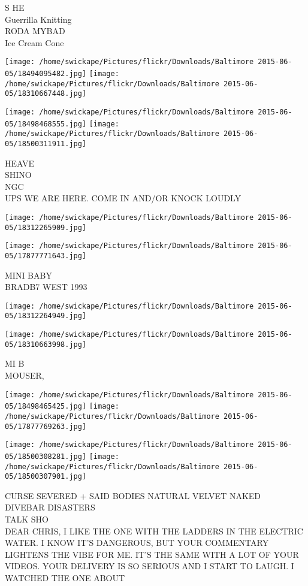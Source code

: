 \documentclass[10pt,letterpaper]{article}
\begin{document}
S HE\\
Guerrilla Knitting\\
RODA MYBAD\\
Ice Cream Cone
\pagebreak

\texttt{[image: /home/swickape/Pictures/flickr/Downloads/Baltimore 2015-06-05/18494095482.jpg]}
\texttt{[image: /home/swickape/Pictures/flickr/Downloads/Baltimore 2015-06-05/18310667448.jpg]}

\texttt{[image: /home/swickape/Pictures/flickr/Downloads/Baltimore 2015-06-05/18498468555.jpg]}
\texttt{[image: /home/swickape/Pictures/flickr/Downloads/Baltimore 2015-06-05/18500311911.jpg]}

HEAVE\\
SHINO\\
NGC\\
UPS WE ARE HERE.  COME IN AND/OR KNOCK LOUDLY
\pagebreak

\texttt{[image: /home/swickape/Pictures/flickr/Downloads/Baltimore 2015-06-05/18312265909.jpg]}

\vspace{0.25in}
\texttt{[image: /home/swickape/Pictures/flickr/Downloads/Baltimore 2015-06-05/17877771643.jpg]}

MINI BABY\\
BRADB7 WEST 1993
\pagebreak

\texttt{[image: /home/swickape/Pictures/flickr/Downloads/Baltimore 2015-06-05/18312264949.jpg]}

\vspace{0.25in}
\texttt{[image: /home/swickape/Pictures/flickr/Downloads/Baltimore 2015-06-05/18310663998.jpg]}

MI B\\
MOUSER,
\pagebreak

\texttt{[image: /home/swickape/Pictures/flickr/Downloads/Baltimore 2015-06-05/18498465425.jpg]}
\texttt{[image: /home/swickape/Pictures/flickr/Downloads/Baltimore 2015-06-05/17877769263.jpg]}

\texttt{[image: /home/swickape/Pictures/flickr/Downloads/Baltimore 2015-06-05/18500308281.jpg]}
\texttt{[image: /home/swickape/Pictures/flickr/Downloads/Baltimore 2015-06-05/18500307901.jpg]}

CURSE SEVERED  + SAID BODIES NATURAL VELVET NAKED\\
DIVEBAR DISASTERS\\
TALK SHO\\
DEAR CHRIS, I LIKE THE ONE WITH THE LADDERS IN THE ELECTRIC WATER.  I KNOW IT'S DANGEROUS, BUT YOUR COMMENTARY LIGHTENS THE VIBE FOR ME.  IT'S THE SAME WITH A LOT OF YOUR VIDEOS.  YOUR DELIVERY IS SO SERIOUS AND I START TO LAUGH.  I WATCHED THE ONE ABOUT
\pagebreak
\end{document}
